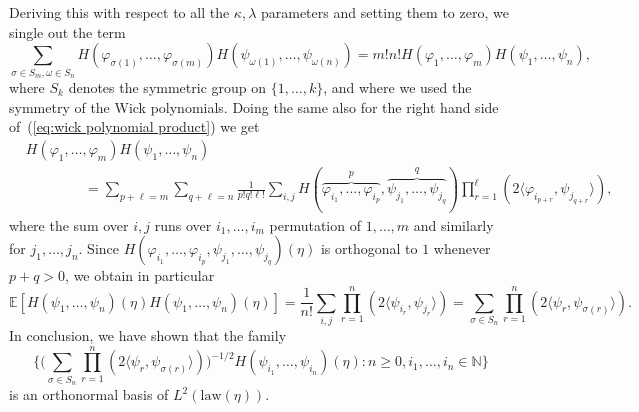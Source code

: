 \documentclass[a4paper,11pt]{article}
\begin{document}
Deriving this with respect to all the $\kappa, \lambda$ parameters and setting
them to zero, we single out the term
\[ \sum_{\sigma \in S_m, \omega \in S_n} H (\varphi_{\sigma (1)}, \ldots,
   \varphi_{\sigma (m)}) H (\psi_{\omega (1)}, \ldots, \psi_{\omega (n)}) =
   m!n!H (\varphi_1, \ldots, \varphi_m) H (\psi_1, \ldots, \psi_n), \]
where $S_k$ denotes the symmetric group on $\{ 1, \ldots, k \}$, and where we
used the symmetry of the Wick polynomials. Doing the same also for the right
hand side of~(\ref{eq:wick polynomial product}) we get
\begin{align*}
   & H (\varphi_1, \ldots, \varphi_m) H (\psi_1, \ldots, \psi_n) \\
   &\hspace{50pt} = \sum_{p +\ell = m} \sum_{q + \ell = n} \frac{1}{p!q! \ell !} \sum_{i, j} H(\overbrace{\varphi_{i_1}, \ldots, \varphi_{i_p}}^p, \overbrace{\psi_{j_1}, \ldots, \psi_{j_q}}^q) \prod_{r = 1}^{\ell} (2 \langle \varphi_{i_{p + r}}, \psi_{j_{q + r}} \rangle),
\end{align*}
where the sum over $i, j$ runs over $i_1, \ldots, i_m$ permutation of $1,
\ldots, m$ and similarly for $j_1, \ldots, j_n$. Since $H(\varphi_{i_1}, \ldots, \varphi_{i_p}, \psi_{j_1}, \ldots, \psi_{j_q})(\eta)$ is orthogonal to $1$ whenever $p+q>0$, we obtain in particular
\[ \mathbb{E} [H (\psi_1, \ldots, \psi_n)(\eta) H (\psi_1, \ldots, \psi_n)(\eta)] =
   \frac{1}{n!} \sum_{i, j} \prod_{r = 1}^n (2 \langle \psi_{i_r}, \psi_{j_r}
   \rangle) = \sum_{\sigma \in S_n} \prod_{r = 1}^n ( 2 \langle \psi_r,
   \psi_{\sigma (r)} \rangle ). \]
In conclusion, we have shown that the family
\[
   \Big\{ \Big(\sum_{\sigma \in S_n} \prod_{r = 1}^n ( 2 \langle \psi_r,
   \psi_{\sigma (r)} \rangle )\Big)^{-1/2} H (\psi_{i_1}, \ldots, \psi_{i_n}) (\eta) : n \geqslant 0, i_1, \ldots, i_n \in \mathbb{N} \Big\}
\]
is an orthonormal basis of $L^2(\mathrm{law}(\eta))$.
\end{document}

